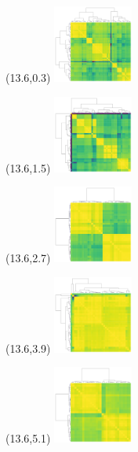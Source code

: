 \documentclass{article}
\begin{document}
\begin{textblock}{1}(13.6,0.3)    \includegraphics[height=1in]{main-figure-assets/clustermaps/5qtel_1-500K_1_12_12_rc.pdf}        \end{textblock}
\begin{textblock}{1}(13.6,1.5)    \includegraphics[height=1in]{main-figure-assets/clustermaps/6qtel_1-500K_1_12_12_rc.pdf}        \end{textblock}
\begin{textblock}{1}(13.6,2.7)    \includegraphics[height=1in]{main-figure-assets/clustermaps/chr7.pdf}                           \end{textblock}
\begin{textblock}{1}(13.6,3.9)    \includegraphics[height=1in]{main-figure-assets/clustermaps/chr8.pdf}                           \end{textblock}
\begin{textblock}{1}(13.6,5.1)    \includegraphics[height=1in]{main-figure-assets/clustermaps/chr11.pdf}                          \end{textblock}
\end{document}
